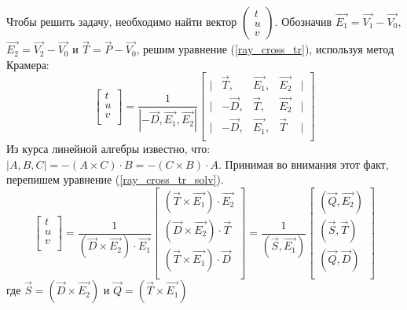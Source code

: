 \documentclass[12pt, a4paper, utf8]{article}
\def\VEC#1#2#3{\left( \begin{array}{c} #1 \\ #2 \\ #3 \end{array} \right) }
\begin{document}
Чтобы решить задачу, необходимо найти вектор $\VEC{t}{u}{v}$. Обозначив $\vec{E_1} = \vec{V_1} - \vec{V_0}$, $\vec{E_2} = \vec{V_2} - \vec{V_0}$ и $\vec{T} = \vec{P} - \vec{V_0}$, решим уравнение (\ref{ray_cross_tr}), используя метод Крамера:
\begin{equation}
\label{ray_cross_tr_solv}
\left[  
\begin{array}{c} t \\ u \\ v \\ \end{array}
\right] = 
\frac{1}{| -\vec{D}, \vec{E_1}, \vec{E_2}|} 
\left[  
	\begin{array}{lcccl}
	|& \vec{T} , & \vec{E_1}, &\vec{E_2} & | \\
	|&-\vec{D} , & \vec{T}  , &\vec{E_2} & | \\
	|&-\vec{D} , & \vec{E_1}, &\vec{T}   & | \\
	\end{array}
\right] 
\end{equation}
Из курса линейной алгебры известно, что: $|A, B, C| = - (A \times C) \cdot B = - (C \times B) \cdot A$. Принимая во внимания этот факт, перепишем уравнение (\ref{ray_cross_tr_solv}).
\begin{equation}
\label{ray_cross_tr_solv2}
\left[  
\begin{array}{c} t \\ u \\ v \\ \end{array}
\right] = 
\frac{1}{(\vec{D} \times \vec{E_2})\cdot \vec{E_1}} 
\left[  
	\begin{array}{c}
	(\vec{T} \times \vec{E_1}) \cdot \vec{E_2} \\
	(\vec{D} \times \vec{E_2}) \cdot \vec{T} \\
	(\vec{T} \times \vec{E_1}) \cdot \vec{D} \\
	\end{array}
\right] = 
\frac{1}{(\vec{S}, \vec{E_1})} 
\left[  
	\begin{array}{c}
	(\vec{Q}, \vec{E_2}) \\
	(\vec{S}, \vec{T}) \\	
	(\vec{Q}, \vec{D}) \\	
	\end{array}
\right]
\end{equation}
где $\vec{S} = (\vec{D} \times \vec{E_2})$ и $\vec{Q} = (\vec{T} \times \vec{E_1})$
\end{document}
